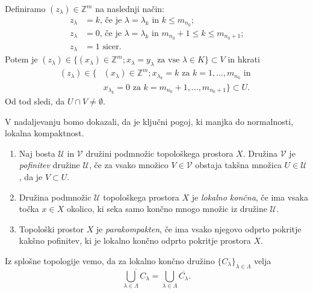 \documentclass[mat1]{fmfdelo}
\newcommand{\Z}{\mathbb Z}
\newcommand{\closure}[1]{\overline{#1}}
\begin{document}
\begin{dokaz}
Definiramo $(z_\lambda) \in \Z^m$ na naslednji način:
\begin{align*}
	z_\lambda &= k \text{, če je $\lambda = \lambda_k$ in $k \leq m_{n_0}$;} \\
	z_\lambda &= 0 \text{, če je $\lambda = \lambda_k$ in $m_{n_0} + 1 \leq k \leq m_{n_0+1}$;} \\
	z_\lambda &= 1 \text{ sicer.}
\end{align*}
Potem je $(z_\lambda) \in \lbrace (x_\lambda) \in \Z^m ; x_\lambda = y_\lambda \text{ za vse } \lambda  \in K \rbrace \subset V$ in hkrati
\begin{align*}
(z_\lambda) \in \lbrace &(x_\lambda) \in \Z^m ; x_{\lambda_k} = k \text{ za } k=1,\dots,m_{n_0} \text{ in }\\
& x_{\lambda_k} = 0 \text{ za } k = m_{n_0}+1,\dots, m_{n_0 + 1}\rbrace \subset U.
\end{align*}
Od tod sledi, da $U \cap V \neq \emptyset$.
\end{dokaz}

V nadaljevanju bomo dokazali, da je ključni pogoj, ki manjka do normalnosti, lokalna kompaktnost.

\begin{definicija}\label{def:parakompakt}
	\begin{enumerate}
		\item Naj bosta $\mathcal{U}$ in $\mathcal{V}$ družini podmnožic topološkega prostora $X$. Družina $\mathcal{V}$ je \emph{pofinitev} družine $\mathcal{U}$, če za vsako množico $V \in \mathcal{V}$ obstaja takšna množica $U \in \mathcal{U}$, da je $V \subset U$.
		\item Družina podmnožic $\mathcal{U}$ topološkega prostora $X$ je \emph{lokalno končna}, če ima vsaka točka $x \in X$ okolico, ki seka samo končno mnogo množic iz družine $\mathcal{U}$.
		\item Topološki prostor $X$ je \emph{parakompakten}, če ima vsako njegovo odprto pokritje kakšno pofinitev, ki je lokalno končno odprto pokritje prostora $X$.
	\end{enumerate}
\end{definicija}

\begin{opomba}\label{opo:lokkon} %
Iz splošne topologije vemo, da za lokalno končno družino $\lbrace C_\lambda \rbrace_{\lambda \in \Lambda}$ velja
\[ \closure{\bigcup_{\lambda \in \Lambda} C_\lambda} = \bigcup_{\lambda \in \Lambda} \closure{C_\lambda}. \]
\end{opomba}
\end{document}
